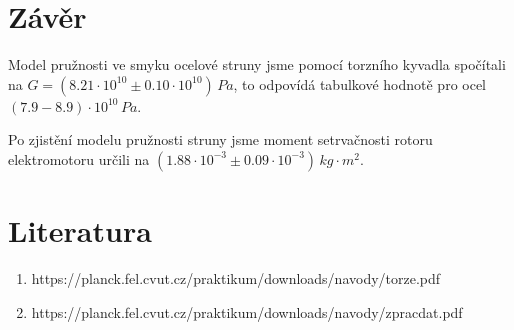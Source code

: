 \documentclass[11pt, a4paper]{report}
\begin{document}


\chapter{Závěr}
\large
Model pružnosti ve smyku ocelové struny jsme pomocí torzního kyvadla spočítali na $G = (8.21\cdot10^{10}\pm0.10\cdot10^{10})\,Pa$, to odpovídá tabulkové hodnotě pro ocel $(7.9-8.9)\cdot10^{10}\,Pa$.
\newline
\newline

\noindent Po zjistění modelu pružnosti struny jsme moment setrvačnosti rotoru elektromotoru určili na $(1.88\cdot10^{-3}\pm0.09\cdot10^{-3})\,kg\cdot m^2$.

\chapter{Literatura}
\begin{enumerate}
	\item https://planck.fel.cvut.cz/praktikum/downloads/navody/torze.pdf
	\item https://planck.fel.cvut.cz/praktikum/downloads/navody/zpracdat.pdf
\end{enumerate}
\end{document}
